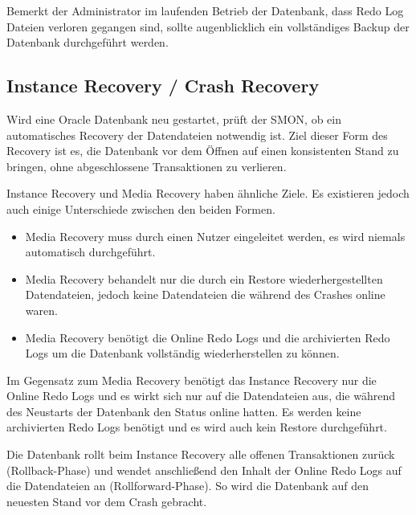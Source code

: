           \begin{merke}
            Bemerkt der Administrator im laufenden Betrieb der Datenbank, dass Redo Log Dateien verloren gegangen sind, sollte augenblicklich ein vollständiges Backup der Datenbank durchgeführt werden.
          \end{merke}
      \subsection{Instance Recovery / Crash Recovery}
        Wird eine Oracle Datenbank neu gestartet, prüft der SMON, ob ein automatisches Recovery der Datendateien notwendig ist. Ziel dieser Form des Recovery ist es, die Datenbank vor dem Öffnen auf einen konsistenten Stand zu bringen, ohne abgeschlossene Transaktionen zu verlieren.

        Instance Recovery und Media Recovery haben ähnliche Ziele. Es existieren jedoch auch einige Unterschiede zwischen den beiden Formen.
        \begin{itemize}
          \item Media Recovery muss durch einen Nutzer eingeleitet werden, es wird niemals automatisch durchgeführt.
          \item Media Recovery behandelt nur die durch ein Restore wiederhergestellten Datendateien, jedoch keine Datendateien die während des Crashes online waren.
          \item Media Recovery benötigt die Online Redo Logs und die archivierten Redo Logs um die Datenbank vollständig wiederherstellen zu können.
        \end{itemize}
        Im Gegensatz zum Media Recovery benötigt das Instance Recovery nur die Online Redo Logs und es wirkt sich nur auf die Datendateien aus, die während des Neustarts der Datenbank den Status online hatten. Es werden keine archivierten Redo Logs benötigt und es wird auch kein Restore durchgeführt.

        Die Datenbank rollt beim Instance Recovery alle offenen Transaktionen zurück (Rollback-Phase) und wendet anschließend den Inhalt der Online Redo Logs auf die Datendateien an (Rollforward-Phase). So wird die Datenbank auf den neuesten Stand vor dem Crash gebracht.
